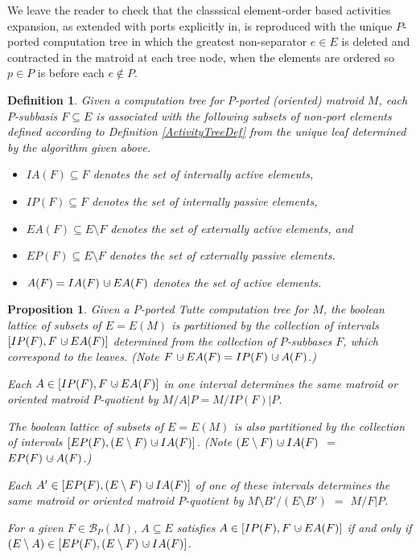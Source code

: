 \documentclass[12pt,leqno]{amsart}
\newtheorem{prop}[lem]{Proposition}
\newtheorem{definition}[lem]{Definition}
\theoremstyle{remark}
\newcommand{\dunion}
{\mbox{\hbox{\hskip6pt$\cdot$\hskip-5.50pt$\cup$\hskip2pt}}}
\begin{document}
We leave the reader to check that 
the classsical element-order based activities
expansion, as extended with ports explicitly
in\cite{RelTuttePoly}, is reproduced with 
the unique $P$-ported
computation tree in which the greatest non-separator $e\in E$ is
deleted and contracted in the matroid at each tree node,
when the elements are ordered
so $p\in P$ is 
before each $e\not\in P$.

\begin{definition}
\label{ActivitySymbolsDef}
Given a computation tree for 
$P$-ported (oriented) matroid $M$,
each $P$-subbasis $F\subseteq E$
is associated with the following subsets of non-port elements
defined according to Definition \ref{ActivityTreeDef}
from the unique leaf determined by the algorithm given above.
\begin{itemize}
\item $IA(F)\subseteq F$ denotes the set of internally active elements,
\item $IP(F)\subseteq F$ denotes the set of internally passive elements,
\item $EA(F)\subseteq E\setminus F$ 
denotes the set of externally active elements,
and 
\item $EP(F)\subseteq E\setminus F$ denotes the set of externally
passive elements.
\item $A(F)=IA(F)\dunion EA(F)$ denotes the set of active elements.
\end{itemize}
\end{definition}

\begin{prop}
\label{PartitionProposition}
Given a $P$-ported Tutte computation tree for
$M$, 
the boolean lattice of subsets of $E=E(M)$
is partitioned by the collection of
intervals $[IP(F),F\dunion EA(F)]$ 
determined from the collection
of $P$-subbases $F$, which correspond to the leaves.
(Note $F\dunion EA(F)=IP(F)\dunion A(F)$.)

Each $A\in [IP(F),F\dunion EA(F)]$ in one interval determines the
same matroid or oriented matroid  $P$-quotient
by $M/A|P=M/IP(F)|P$.

The boolean lattice of subsets of $E=E(M)$
is also partitioned by the collection of
intervals $[EP(F),(E\setminus F)\dunion IA(F)]$.
(Note $(E\setminus F)\dunion IA(F)$ $=$ $EP(F)\dunion A(F)$.)

Each $A'\in [EP(F), (E\setminus F)\dunion IA(F)]$ of one of these
intervals determines the same matroid or oriented matroid
$P$-quotient by $M\setminus B'/(E\setminus B')$
$=$ $M/F|P$.

For a given $F\in\mathcal{B}_P(M)$, $A\subseteq E$ satisfies
$A\in [IP(F),F\dunion EA(F)]$ if and only if 
$(E\setminus A)\in [EP(F),(E\setminus F)\dunion IA(F)]$. 
\end{prop}
\end{document}
